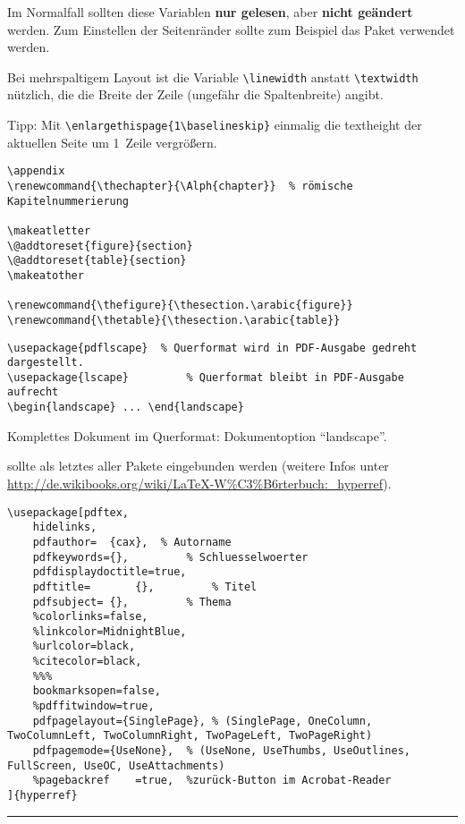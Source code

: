 \normalsize

	Im Normalfall sollten diese Variablen \textbf{nur gelesen}, aber \textbf{nicht geändert} werden.
	Zum Einstellen der Seitenränder sollte zum Beispiel das Paket  verwendet werden.

Bei mehrspaltigem Layout ist die Variable \lstinline|\linewidth| anstatt \lstinline|\textwidth| nützlich, die die Breite der Zeile (ungefähr die Spaltenbreite) angibt.

Tipp: Mit \lstinline|\enlargethispage{1\baselineskip}| einmalig die textheight der aktuellen Seite um 1~Zeile vergrößern.

\begin{lstlisting}
\appendix
\renewcommand{\thechapter}{\Alph{chapter}}  % römische Kapitelnummerierung

\makeatletter
\@addtoreset{figure}{section}
\@addtoreset{table}{section}
\makeatother

\renewcommand{\thefigure}{\thesection.\arabic{figure}}
\renewcommand{\thetable}{\thesection.\arabic{table}}
\end{lstlisting}
\notizenplatz






\noindent\begin{minipage}{\linewidth}
\negAbstand

\begin{lstlisting}
\usepackage{pdflscape} 	% Querformat wird in PDF-Ausgabe gedreht dargestellt.
\usepackage{lscape}			% Querformat bleibt in PDF-Ausgabe aufrecht
\begin{landscape} ... \end{landscape}
\end{lstlisting}
\end{minipage}
%
Komplettes Dokument im Querformat: Dokumentoption "`landscape"'.

 sollte als letztes aller Pakete eingebunden werden (weitere Infos unter \url{http://de.wikibooks.org/wiki/LaTeX-W%C3%B6rterbuch:_hyperref}).
\begin{lstlisting}
\usepackage[pdftex,
	hidelinks,
	pdfauthor=	{cax},	% Autorname
	pdfkeywords={},			% Schluesselwoerter
	pdfdisplaydoctitle=true, 
	pdftitle=		{},			% Titel
	pdfsubject=	{}, 		% Thema
	%colorlinks=false,
	%linkcolor=MidnightBlue,
	%urlcolor=black,
	%citecolor=black,
	%%%
	bookmarksopen=false,
	%pdffitwindow=true,
	pdfpagelayout={SinglePage},	% (SinglePage, OneColumn, TwoColumnLeft, TwoColumnRight, TwoPageLeft, TwoPageRight)
	pdfpagemode={UseNone},	% (UseNone, UseThumbs, UseOutlines, FullScreen, UseOC, UseAttachments)
	%pagebackref 	=true, 	%zurück-Button im Acrobat-Reader
]{hyperref} 
\end{lstlisting}

\notizenplatz
\notizenplatz

\hrule \vspace{0.5\baselineskip}

